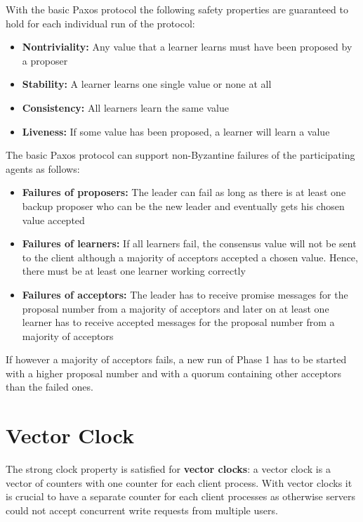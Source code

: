 With the basic Paxos protocol the following safety properties are guaranteed to hold for each individual run of the protocol:
\begin{itemize}
    \item \textbf{Nontriviality:} Any value that a learner learns must have been proposed by a proposer
    \item \textbf{Stability:} A learner learns one single value or none at all
    \item \textbf{Consistency:} All learners learn the same value
    \item \textbf{Liveness:} If some value has been proposed, a learner will learn a value
\end{itemize}

The basic Paxos protocol can support non-Byzantine failures of the participating agents as follows:
\begin{itemize}
    \item \textbf{Failures of proposers:} The leader can fail as long as there is at least one backup proposer who can be the new leader and eventually gets his chosen value accepted
    \item \textbf{Failures of learners:} If all learners fail, the consensus value will not be sent to the client although a majority of acceptors accepted a chosen value. Hence, there must be at least one learner working correctly
    \item \textbf{Failures of acceptors:} The leader has to receive promise messages for the proposal number from a majority of acceptors and later on at least one learner has to receive accepted messages for the proposal number from a majority of acceptors
\end{itemize}
If however a majority of acceptors fails, a new run of Phase 1 has to be started with a higher proposal number and with a quorum containing other acceptors than the failed ones.

\section{Vector Clock}
The strong clock property is satisfied for \textbf{vector clocks}: a vector clock is a vector of counters with one counter for each client process. With vector clocks it is crucial to have a separate counter for each client processes as otherwise servers could not accept concurrent write requests from multiple users.

